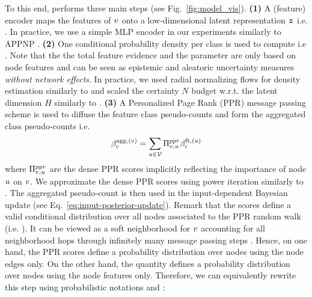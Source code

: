 To this end, \GPNacro{} performs three main steps (see Fig.~\ref{fig:model_vis}). \textbf{(1)} A (feature) encoder maps the features of $v$ onto a low-dimensional latent representation $\bm{z}$ i.e. . In practice, we use a simple MLP encoder in our experiments similarly to APPNP \citep{Klicpera2018}. \textbf{(2)} One conditional probability density per class \smash{$\prob(\z^{(\nodev)} \condition \iclass; \vphi)$} is used to compute  i.e . Note that the the total feature evidence  and the parameter  are only based on node features and can be seen as epistemic and aleatoric uncertainty measures \emph{without network effects}. In practice, we used radial normalizing flows for density estimation similarly to \citep{charpentier2020} and scaled the certainty $N$ budget w.r.t. the latent dimension $H$ similarly to \citep{NatPN2021}. \textbf{(3)} A Personalized Page Rank (PPR) message passing scheme is used to diffuse the feature class pseudo-counts  and form the aggregated class pseudo-counts  i.e.
\begin{equation}\label{eq:agg-evidence}
    \beta_c^{\text{agg}, (v)} = \sum_{u \in \mathcal{V}} \Pi^{ppr}_{v, u} \beta_c^{\text{ft}, (u)}
\end{equation}
where $\Pi^{ppr}_{v, u}$ are the dense PPR scores implicitly reflecting the importance of node $u$ on $v$. We approximate the dense PPR scores using power iteration similarly to \citep{Klicpera2018}. The aggregated pseudo-count  is then used in the input-dependent Bayesian update (see Eq.~\ref{eq:input-posterior-update}). Remark that the scores  define a valid conditional distribution over all nodes associated to the PPR random walk (i.e. ). It can be viewed as a soft neighborhood for $v$ accounting for all neighborhood hops through infinitely many message passing steps \citep{Klicpera2018}. Hence, on one hand, the PPR scores define a probability distribution over nodes using the node edges only. On the other hand, the quantity \smash{$\prob(\z^{(\nodeu)} \condition \iclass; \vphi)$} defines a probability distribution over nodes using the node features only. Therefore, we can equivalently rewrite this step using probabilistic notations  and \smash{$\prob(\nodeu \condition \iclass) = \prob(\z^{(\nodeu)} \condition \iclass; \vphi)$}:
